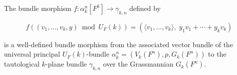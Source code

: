 The bundle morphism $f: \alpha_k^n[F^k] \to \gamma_{k,n}$ defined by

$$f((v_1, \ldots, v_k, y) \bmod U_F(k)) = (\langle v_1, \ldots, v_k \rangle, \; y_1 v_1 + \cdots + y_k v_k)$$

is a well-defined bundle morphism from the associated vector bundle of the universal principal $U_F(k)$-bundle $\alpha_k^n = (V_k(F^n), p, G_k(F^n))$ to the tautological $k$-plane bundle $\gamma_{k,n}$ over the Grassmannian $G_k(F^n)$.

